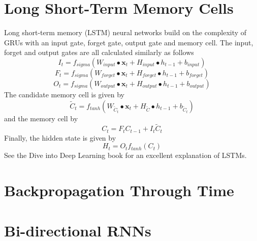 \documentclass[]{article}
\begin{document}
\section{Long Short-Term Memory Cells}
Long short-term memory (LSTM) neural networks build on the complexity of GRUs with an input gate, forget gate, output gate and memory cell. The input, forget and output gates are all calculated similarly as follows
\begin{equation}
I_{t} = f_{sigma}(W_{input} \bullet \textbf{x}_{t} + H_{input} \bullet h_{t-1} + b_{input})
\end{equation}
\begin{equation}
F_{t} = f_{sigma}(W_{forget} \bullet \textbf{x}_{t} + H_{forget} \bullet h_{t-1} + b_{forget})
\end{equation}
\begin{equation}
O_{t} = f_{sigma}(W_{output} \bullet \textbf{x}_{t} + H_{output} \bullet h_{t-1} + b_{output})
\end{equation}
The candidate memory cell is given by
\begin{equation}
\tilde{C}_{t} = f_{tanh}(W_{\tilde{C}_{t}} \bullet \textbf{x}_{t} + H_{\tilde{C}} \bullet h_{t-1} + b_{\tilde{C}_{t}})
\end{equation}
and the memory cell by
\begin{equation}
C_{t} = F_{t}  C_{t-1} + I_{t} \tilde{C}_{t}
\end{equation}
Finally, the hidden state is given by
\begin{equation}
H_{t} = O_{t}f_{tanh}(C_{t})
\end{equation}
See the Dive into Deep Learning book for an excellent explanation of LSTMs.
\section{Backpropagation Through Time}

\section{Bi-directional RNNs}


{}

\end{document}
